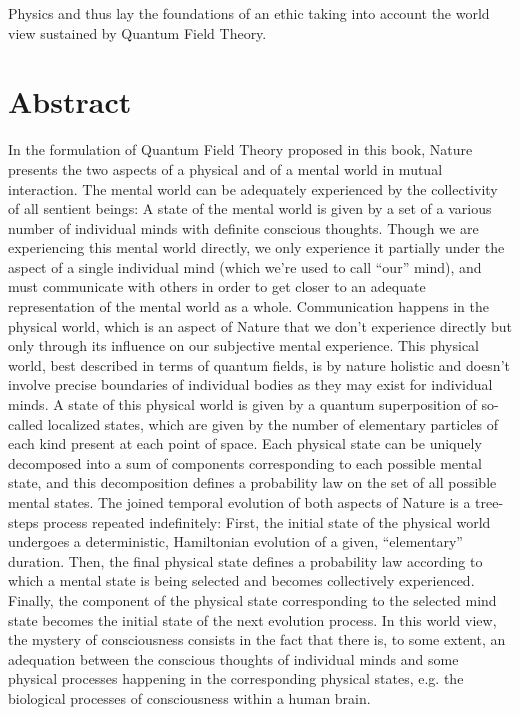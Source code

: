\documentclass[10pt,a4paper,twoside,openany]{book}
\begin{document}
Physics and thus lay the foundations of an ethic taking into account the world view sustained by Quantum Field Theory.


\section*{Abstract}

In the formulation of Quantum Field Theory proposed in this book, Nature presents the two aspects of a physical and of a mental world in mutual interaction. The mental world can be adequately experienced by the collectivity of all sentient beings: A state of the mental world is given by a set of a various number of individual minds with definite conscious thoughts. Though we are experiencing this mental world directly, we only experience it partially under the aspect of a single individual mind (which we're used to call ``our'' mind), and must communicate with others in order to get closer to an adequate representation of the mental world as a whole. Communication happens in the physical world, which is an aspect of Nature that we don't experience directly but only through its influence on our subjective mental experience. This physical world, best described in terms of quantum fields, is by nature holistic and doesn't involve precise boundaries of individual bodies as they may exist for individual minds. A state of this physical world is given by a quantum superposition of so-called localized states, which are given by the number of elementary particles of each kind present at each point of space. Each physical state can be uniquely decomposed into a sum of components corresponding to each possible mental state, and this decomposition defines a probability law on the set of all possible mental states. The joined temporal evolution of both aspects of Nature is a tree-steps process repeated indefinitely: First, the initial state of the physical world undergoes a deterministic, Hamiltonian evolution of a given, ``elementary'' duration. Then, the final physical state defines a probability law according to which a mental state is being selected and becomes collectively experienced. Finally, the component of the physical state corresponding to the selected mind state becomes the initial state of the next evolution process. In this world view, the mystery of consciousness consists in the fact that there is, to some extent, an adequation between the conscious thoughts of individual minds and some physical processes happening in the corresponding physical states, e.g. the biological processes of consciousness within a human brain.
\end{document}
